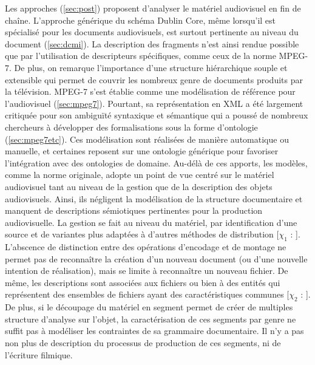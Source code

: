 Les approches  (\ref{sec:post}) proposent d'analyser le matériel audiovisuel en fin de chaîne. 
L'approche générique du schéma Dublin Core, même lorsqu'il est spécialisé pour les documents audiovisuels, est surtout pertinente au niveau du document (\ref{sec:dcmi}). 
La description des fragments n'est ainsi rendue possible que par l'utilisation de descripteurs spécifiques, comme ceux de la norme MPEG-7. 
De plus, on remarque l'importance d'une structure hiérarchique souple et extensible qui permet de couvrir les nombreux genre de documents produits par la télévision.
MPEG-7 s'est établie comme une modélisation de référence pour l'audiovisuel (\ref{sec:mpeg7}).
Pourtant, sa représentation en XML a été largement critiquée pour son ambiguïté syntaxique et sémantique qui a poussé de nombreux chercheurs à développer des formalisations sous la forme d'ontologie (\ref{sec:mpeg7etc}).
Ces modélisation sont réalisées de manière automatique ou manuelle, et certaines reposent sur une ontologie générique pour favoriser l'intégration avec des ontologies de domaine.
Au-délà de ces apports, les modèles, comme la norme originale, adopte un point de vue centré sur le matériel audiovisuel tant au niveau de la gestion que de la description des objets audiovisuels. 
Ainsi, ils négligent la modélisation de la structure documentaire et manquent de descriptions sémiotiques pertinentes pour la production audiovisuelle. %
La gestion se fait au niveau du matériel, par identification d'une source et de variantes plus adaptées à d'autres méthodes de distribution [$\chi_1$ : ].
L'abscence de distinction entre des opérations d'encodage et de montage ne permet pas de reconnaître la création d'un nouveau document (ou d'une nouvelle intention de réalisation), mais se limite à reconnaître un nouveau fichier.
De même, les descriptions sont associées aux fichiers ou bien à des entités qui représentent des ensembles de fichiers ayant des caractéristiques communes [$\chi_2$ : ]. 
De plus, si le découpage du matériel en segment permet de créer de multiples structure d'analyse sur l'objet, la caractérisation de ces segments par genre ne suffit pas à modéliser les contraintes de sa grammaire documentaire.
Il n'y a pas non plus de description du processus de production de ces segments, ni de l'écriture filmique.

